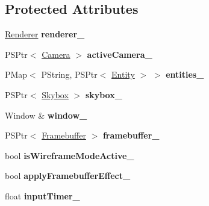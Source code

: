 \subsection*{Protected Attributes}
\begin{DoxyCompactItemize}
\item 
\mbox{\label{classprz_1_1_scene_a24a99ab494d44283d6bcf6828f9e6dea}} 
\mbox{\hyperlink{classprz_1_1_renderer}{Renderer}} {\bfseries renderer\+\_\+}
\item 
\mbox{\label{classprz_1_1_scene_a94c4031887163a16526986a41d29aa19}} 
P\+S\+Ptr$<$ \mbox{\hyperlink{classprz_1_1_camera}{Camera}} $>$ {\bfseries active\+Camera\+\_\+}
\item 
\mbox{\label{classprz_1_1_scene_ac3845fa3686d450470508a9f84aca3a3}} 
P\+Map$<$ P\+String, P\+S\+Ptr$<$ \mbox{\hyperlink{classprz_1_1_entity}{Entity}} $>$ $>$ {\bfseries entities\+\_\+}
\item 
\mbox{\label{classprz_1_1_scene_a5be14acdc2018956835558e66c10bb4e}} 
P\+S\+Ptr$<$ \mbox{\hyperlink{classprz_1_1_skybox}{Skybox}} $>$ {\bfseries skybox\+\_\+}
\item 
\mbox{\label{classprz_1_1_scene_a0291cb68b6a804a503f70a6965427ef9}} 
Window \& {\bfseries window\+\_\+}
\item 
\mbox{\label{classprz_1_1_scene_ae1e16e4d41ba0f5fbdd932d69273ee93}} 
P\+S\+Ptr$<$ \mbox{\hyperlink{classprz_1_1_framebuffer}{Framebuffer}} $>$ {\bfseries framebuffer\+\_\+}
\item 
\mbox{\label{classprz_1_1_scene_a163d4ca0d86d3f9c994997de3cf166f6}} 
bool {\bfseries is\+Wireframe\+Mode\+Active\+\_\+}
\item 
\mbox{\label{classprz_1_1_scene_a1d7e498c1bfc2a26da3aa64c915e861d}} 
bool {\bfseries apply\+Framebuffer\+Effect\+\_\+}
\item 
\mbox{\label{classprz_1_1_scene_ae10b9e2eed16a4c52af6a1e02abc1c35}} 
float {\bfseries input\+Timer\+\_\+}
\end{DoxyCompactItemize}


